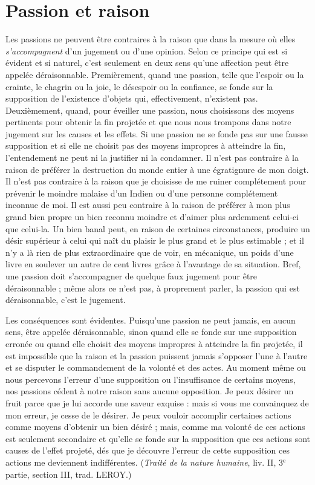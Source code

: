 
\section{Passion et raison}
Les passions ne peuvent être contraires à la raison que
dans la mesure où elles {\it s’accompagnent} d’un jugement ou
d’une opinion. Selon ce principe qui est si évident et si
naturel, c’est seulement en deux sens qu’une affection
peut être appelée déraisonnable. Premièrement, quand
une passion, telle que l’espoir ou la crainte, le chagrin ou
la joie, le désespoir ou la confiance, se fonde sur la supposition
de l’existence d’objets qui, effectivement, n’existent
pas. Deuxièmement, quand, pour éveiller une passion,
nous choisissons des moyens pertinents pour obtenir la
fin projetée et que nous nous trompons dans notre jugement
sur les causes et les effets. Si une passion ne se fonde
pas sur une fausse supposition et si elle ne choisit pas des
moyens impropres à atteindre la fin, l’entendement ne
peut ni la justifier ni la condamner. Il n’est pas contraire
à la raison de préférer la destruction du monde entier à
une égratignure de mon doigt. Il n’est pas contraire à la
raison que je choisisse de me ruiner complétement pour
prévenir le moindre malaise d’un Indien ou d’une personne
complétement inconnue de moi. Il est aussi peu contraire
à la raison de préférer à mon plus grand bien propre un
bien reconnu moindre et d’aimer plus ardemment celui-ci
que celui-la. Un bien banal peut, en raison de certaines
circonstances, produire un désir supérieur à celui qui naît
du plaisir le plus grand et le plus estimable ; et il n’y a là
rien de plus extraordinaire que de voir, en mécanique,
un poids d’une livre en soulever un autre de cent livres
grâce à l’avantage de sa situation. Bref, une passion doit
s’accompagner de quelque faux jugement pour être déraisonnable ;
même alors ce n’est pas, à proprement parler,
la passion qui est déraisonnable, c’est le jugement.

Les conséquences sont évidentes. Puisqu’une passion ne
peut jamais, en aucun sens, être appelée déraisonnable,
sinon quand elle se fonde sur une supposition erronée ou
quand elle choisit des moyens impropres à atteindre la
fin projetée, il est impossible que la raison et la passion
puissent jamais s’opposer l’une à l’autre et se disputer le
commandement de la volonté et des actes. Au moment
même ou nous percevons l’erreur d’une supposition ou
l'insuffisance de certains moyens, nos passions cédent à
notre raison sans aucune opposition. Je peux désirer un
fruit parce que je lui accorde une saveur exquise : mais si
vous me convainquez de mon erreur, je cesse de le désirer.
Je peux vouloir accomplir certaines actions comme moyens
d’obtenir un bien désiré ; mais, comme ma volonté de ces
actions est seulement secondaire et qu’elle se fonde sur la
supposition que ces actions sont causes de l'effet projeté,
dés que je découvre l’erreur de cette supposition ces
actions me deviennent indifférentes. ({\it Traité de la nature
humaine}, liv. II, 3$^\text{e}$ partie, section III, trad. L{\footnotesize EROY}.)


